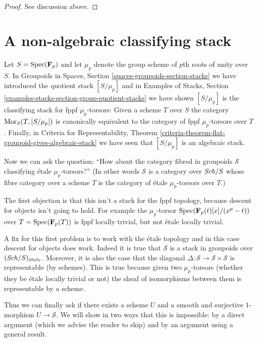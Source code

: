 \begin{proof}
See discussion above.
\end{proof}



\section{A non-algebraic classifying stack}
\label{section-non-algebraic}

\noindent
Let $S = \mathop{\mathrm{Spec}}(\mathbf{F}_p)$ and let $\mu_p$ denote the
group scheme of $p$th roots of unity over $S$. In
Groupoids in Spaces, Section \ref{spaces-groupoids-section-stacks}
we have introduced the quotient stack $[S/\mu_p]$ and in
Examples of Stacks, Section \ref{examples-stacks-section-group-quotient-stacks}
we have shown $[S/\mu_p]$ is the classifying stack for
fppf $\mu_p$-torsors: Given a scheme $T$ over $S$ the category
$\mathop{\mathrm{Mor}}\nolimits_S(T, [S/\mu_p])$ is canonically equivalent to the
category of fppf $\mu_p$-torsors over $T$. Finally, in
Criteria for Representability, Theorem
\ref{criteria-theorem-flat-groupoid-gives-algebraic-stack}
we have seen that $[S/\mu_p]$ is an algebraic stack.

\medskip\noindent
Now we can ask the question: ``How about the category fibred in groupoids
$\mathcal{S}$ classifying \'etale $\mu_p$-torsors?'' (In other words
$\mathcal{S}$ is a category over $\mathit{Sch}/S$ whose fibre category over a
scheme $T$ is the category of \'etale $\mu_p$-torsors over $T$.)

\medskip\noindent
The first objection is that this isn't a stack for the fppf topology,
because descent for objects isn't going to hold. For example the
$\mu_p$-torsor $\mathop{\mathrm{Spec}}(\mathbf{F}_p(t)[x]/(x^p - t))$ over
$T = \mathop{\mathrm{Spec}}(\mathbf{F}_p(T))$ is fppf locally trivial, but
not \'etale locally trivial.

\medskip\noindent
A fix for this first problem is to work with the \'etale topology and
in this case descent for objects does work. Indeed it is true that
$\mathcal{S}$ is a stack in groupoids over $(\mathit{Sch}/S)_{\acute{e}tale}$.
Moreover, it is also the case that the diagonal
$\Delta : \mathcal{S} \to \mathcal{S} \times \mathcal{S}$
is representable (by schemes). This is true because given two
$\mu_p$-torsors (whether they be \'etale locally trivial or not)
the sheaf of isomorphisms between them is representable by a scheme.

\medskip\noindent
Thus we can finally ask if there exists a scheme $U$ and a smooth
and surjective $1$-morphism $U \to \mathcal{S}$. We will show in two
ways that this is impossible: by a direct argument (which we advise
the reader to skip) and by an argument using a general result.

